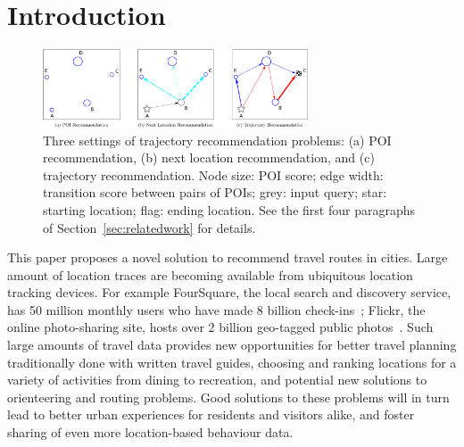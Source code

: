 
\section{Introduction}
\label{sec:intro}

\begin{figure}[ht]
	\centering
	\includegraphics[width=0.7\textwidth]{fig/fig1-flavours.pdf}
	\caption{Three settings of trajectory recommendation problems: (a) POI recommendation, (b) next location recommendation, and (c) trajectory recommendation. Node size: POI score; edge width: transition score between pairs of POIs; grey: input query; star: starting location; flag: ending location. See the first four paragraphs of Section~\ref{sec:relatedwork} for details.
}
	\label{fig:threesettings}
\end{figure}


This paper proposes a novel solution to recommend travel routes in cities.
Large amount of location traces are becoming available from ubiquitous location tracking devices.
For example FourSquare, the local search and discovery service, has 50 million monthly users who have made 8 billion check-ins~\cite{4sq}; Flickr, the online photo-sharing site, hosts over 2 billion geo-tagged public photos~\cite{flickr}. Such large amounts of travel data provides new opportunities for better
travel planning traditionally done with written travel guides,
choosing and ranking locations for a variety of activities from dining to recreation,
and potential new solutions to orienteering and routing problems.
Good solutions to these problems will in turn lead to better urban experiences for residents and visitors alike, and foster sharing of even more location-based behaviour data.

